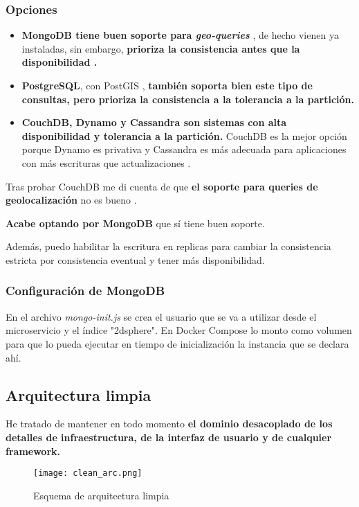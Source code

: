 \subsubsection{Opciones}

\begin{itemize}
	\item \textbf{MongoDB tiene buen soporte para \textit{geo-queries}} \cite{mongo}, de hecho vienen ya instaladas, sin embargo, \textbf{prioriza la consistencia antes que la disponibilidad \cite{mongo-cap}.} 
\item \textbf{PostgreSQL}, con PostGIS \cite{postgis}, \textbf{también soporta bien este tipo de consultas, pero prioriza la consistencia a la tolerancia a la partición.} 
\item \textbf{CouchDB, Dynamo y Cassandra son sistemas con alta disponibilidad y tolerancia a la partición.} CouchDB es la mejor opción porque Dynamo es privativa y Cassandra es más adecuada para aplicaciones con más
escrituras que actualizaciones \cite{cassandra}. 
\end{itemize}



Tras probar CouchDB me di cuenta de que \textbf{el soporte para queries de geolocalización} no es bueno \cite{couchdb}.

\textbf{Acabe optando por MongoDB} que sí tiene buen soporte.

Además, puedo habilitar la escritura en replicas para cambiar la consistencia estricta por consistencia eventual y tener más disponibilidad. 

\subsubsection{Configuración de MongoDB}

En el archivo \textit{mongo-init.js} se crea el usuario que se va a utilizar desde el microservicio y el índice "2dsphere". 
En Docker Compose lo monto como volumen para que lo pueda ejecutar en tiempo de inicialización la instancia que se declara ahí.

\subsection{Arquitectura limpia}\label{sec:clean}

He tratado de mantener en todo momento \textbf{el dominio desacoplado de los detalles de infraestructura, de la interfaz de usuario y de cualquier framework.}
\begin{figure}[H]
	\centering	
	\texttt{[image: clean\_arc.png]}
	\caption{Esquema de arquitectura limpia \cite{clean-arch}}
	\end{figure}

